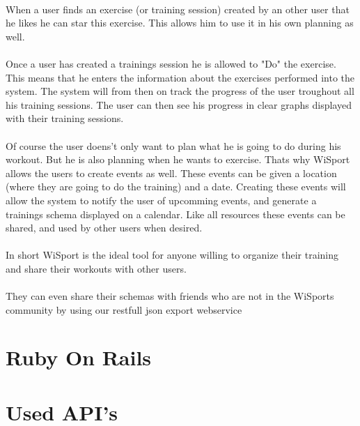\documentclass[11pt,a4paper]{scrartcl}
\begin{document}
\paragraph{}When a user finds an exercise (or training session) created by an other user that he likes he can star this exercise. This allows him to use it in his own planning as well.
\paragraph{}Once a user has created a trainings session he is allowed to "Do" the exercise. This means that he enters the information about the exercises performed into the system. The system will from then on track the progress of the user troughout all his training sessions. The user can then see his progress in clear graphs displayed with their training sessions.
\paragraph{}Of course the user doens't only want to plan what he is going to do during his workout. But he is also planning when he wants to exercise. Thats why WiSport allows the users to create events as well. These events can be given a location (where they are going to do the training) and a date. Creating these events will allow the system to notify the user of upcomming events, and generate a trainings schema displayed on a calendar. Like all resources these events can be shared, and used by other users when desired.
\paragraph{}In short WiSport is the ideal tool for anyone willing to organize their training and share their workouts with other users.
\paragraph{}They can even share their schemas with friends who are not in the WiSports community by using our restfull json export webservice

\section{Ruby On Rails}


\section{Used API's}
\end{document}
